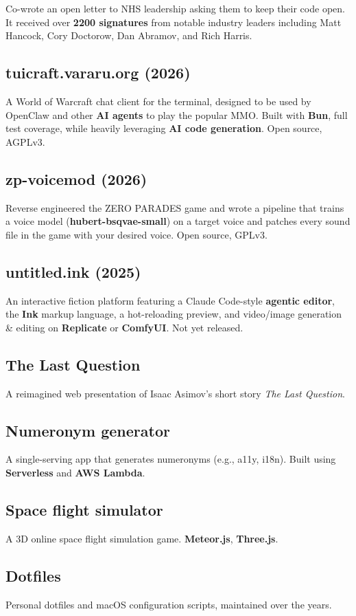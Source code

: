 \documentclass{article}
\begin{document}
Co-wrote an open letter to NHS leadership asking them to keep their code open.
It received over \textbf{2200 signatures} from notable industry leaders
including Matt Hancock, Cory Doctorow, Dan Abramov, and Rich Harris.

\subsection*{tuicraft.vararu.org (2026)}

A World of Warcraft chat client for the terminal, designed to be used by
OpenClaw and other \textbf{AI agents} to play the popular MMO. Built with
\textbf{Bun}, full test coverage, while heavily leveraging \textbf{AI code
generation}. Open source, AGPLv3.

\subsection*{zp-voicemod (2026)}

Reverse engineered the ZERO PARADES game and wrote a pipeline that trains a
voice model (\textbf{hubert-bsqvae-small}) on a target voice and patches every
sound file in the game with your desired voice. Open source, GPLv3.

\subsection*{untitled.ink (2025)}

An interactive fiction platform featuring a Claude Code-style \textbf{agentic
editor}, the \textbf{Ink} markup language, a hot-reloading preview, and
video/image generation \& editing on \textbf{Replicate} or \textbf{ComfyUI}.
Not yet released.

\subsection*{The Last Question}

A reimagined web presentation of Isaac Asimov's short story \textit{The Last
Question}.

\subsection*{Numeronym generator}

A single-serving app that generates numeronyms (e.g., a11y, i18n). Built using
\textbf{Serverless} and \textbf{AWS Lambda}.

\subsection*{Space flight simulator}

A 3D online space flight simulation game. \textbf{Meteor.js}, \textbf{Three.js}.

\subsection*{Dotfiles}

Personal dotfiles and macOS configuration scripts, maintained over the years.
\end{document}

